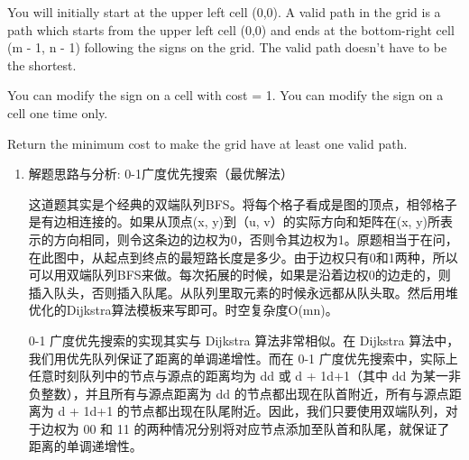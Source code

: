 \documentclass[9pt, b5paaper]{book}
\begin{document}
You will initially start at the upper left cell (0,0). A valid path in the grid is a path which starts from the upper left cell (0,0) and ends at the bottom-right cell (m - 1, n - 1) following the signs on the grid. The valid path doesn't have to be the shortest.

You can modify the sign on a cell with cost = 1. You can modify the sign on a cell one time only.

Return the minimum cost to make the grid have at least one valid path.
\begin{enumerate}
\item 解题思路与分析: 0-1广度优先搜索（最优解法）
\label{sec-1-6-1-1}

这道题其实是个经典的双端队列BFS。将每个格子看成是图的顶点，相邻格子是有边相连接的。如果从顶点(x, y)到（u, v）的实际方向和矩阵在(x, y)所表示的方向相同，则令这条边的边权为0，否则令其边权为1。原题相当于在问，在此图中，从起点到终点的最短路长度是多少。由于边权只有0和1两种，所以可以用双端队列BFS来做。每次拓展的时候，如果是沿着边权0的边走的，则插入队头，否则插入队尾。从队列里取元素的时候永远都从队头取。然后用堆优化的Dijkstra算法模板来写即可。时空复杂度O(mn)。

0-1 广度优先搜索的实现其实与 Dijkstra 算法非常相似。在 Dijkstra 算法中，我们用优先队列保证了距离的单调递增性。而在 0-1 广度优先搜索中，实际上任意时刻队列中的节点与源点的距离均为 dd 或 d + 1d+1（其中 dd 为某一非负整数），并且所有与源点距离为 dd 的节点都出现在队首附近，所有与源点距离为 d + 1d+1 的节点都出现在队尾附近。因此，我们只要使用双端队列，对于边权为 00 和 11 的两种情况分别将对应节点添加至队首和队尾，就保证了距离的单调递增性。


\end{enumerate}
\end{document}
